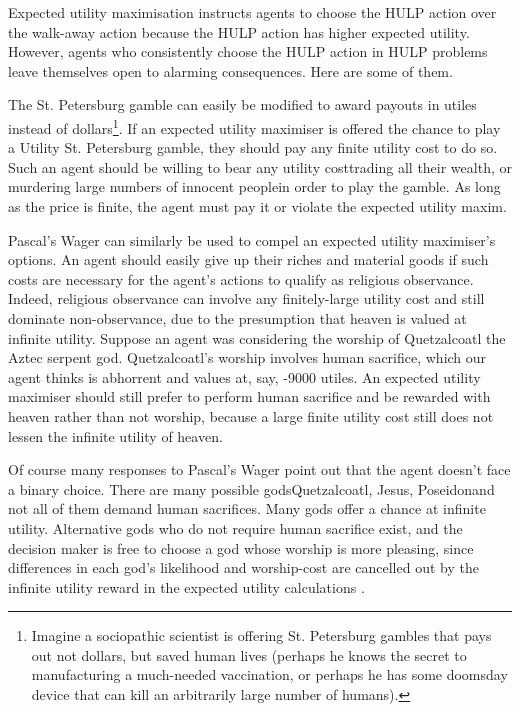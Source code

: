 \documentclass{article}
\begin{document}
Expected utility maximisation instructs agents to choose the HULP action over the walk-away action because the HULP action has higher expected utility. However, agents who consistently choose the HULP action in HULP problems leave themselves open to alarming consequences. Here are some of them.

The St. Petersburg gamble can easily be modified to award payouts in utiles instead of dollars\footnote{Imagine a sociopathic scientist is offering St. Petersburg gambles that pays out not dollars, but saved human lives (perhaps he knows the secret to manufacturing a much-needed vaccination, or perhaps he has some doomsday device that can kill an arbitrarily large number of humans).}. If an expected utility maximiser is offered the chance to play a Utility St. Petersburg gamble, they should pay any finite utility cost to do so. Such an agent should be willing to bear any utility cost\textemdash trading all their wealth, or murdering large numbers of innocent people\textemdash in order to play the gamble. As long as the price is finite, the agent must pay it or violate the expected utility maxim.

Pascal's Wager can similarly be used to compel an expected utility maximiser's options. An agent should easily give up their riches and material goods if such costs are necessary for the agent's actions to qualify as religious observance. Indeed, religious observance can involve any finitely-large utility cost and still dominate non-observance, due to the presumption that heaven is valued at infinite utility. Suppose an agent was considering the worship of Quetzalcoatl the Aztec serpent god. Quetzalcoatl's worship involves human sacrifice, which our agent thinks is abhorrent and values at, say, -9000 utiles. An expected utility maximiser should still prefer to perform human sacrifice and be rewarded with heaven rather than not worship, because a large finite utility cost still does not lessen the infinite utility of heaven. 

Of course many responses to Pascal's Wager point out that the agent doesn't face a binary choice. There are many possible gods\textemdash Quetzalcoatl, Jesus, Poseidon\textemdash and not all of them demand human sacrifices. Many gods offer a chance at infinite utility. Alternative gods who do not require human sacrifice exist, and the decision maker is free to choose a god whose worship is more pleasing, since differences in each god's likelihood and worship-cost are cancelled out by the infinite utility reward in the expected utility calculations \citep{diderot1746pensees}.
\end{document}
